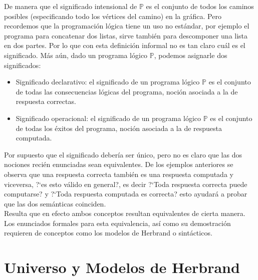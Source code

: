 \documentclass[11pt,letterpaper]{article}
\begin{document}
De manera que el significado intensional de $\mathbb{P}$ es el conjunto de 
todos los caminos posibles (especificando todo los v\'ertices del camino) en la 
gr\'afica. Pero recordemos que la programaci\'on l\'ogica tiene un uso no 
est\'andar, por ejemplo el programa para concatenar dos listas, sirve tambi\'en 
para descomponer una lista en dos partes. Por lo que con esta definici\'on 
informal no es tan claro cu\'al es el significado. M\'as a\'un, dado un 
programa l\'ogico $\mathbb{P}$, podemos asignarle dos significados:
\begin{itemize}
 \item Significado declarativo: 
  el significado de un programa l\'ogico $\mathbb{P}$ es el conjunto de todas 
  las consecuencias l\'ogicas del programa, noci\'on asociada a la de respuesta 
  correctas.
 \item Significado operacional: 
  el significado de un programa l\'ogico $\mathbb{P}$ es el conjunto de todas 
  los \'exitos del programa, noci\'on asociada a la de respuesta computada.
\end{itemize}

Por supuesto que el significado deber\'ia ser \'unico,  pero no es claro que 
las dos nociones reci\'en enunciadas sean equivalentes. De los ejemplos 
anteriores se observa que una respuesta correcta tambi\'en es una respuesta 
computada y viceversa, ?`es esto v\'alido en general?, es decir ?`Toda
respuesta correcta puede computarse? y ?`Toda respuesta computada es
correcta? esto ayudar\'a a probar que las dos sem\'anticas coinciden.  \\
Resulta que en efecto ambos conceptos resultan equivalentes de cierta manera. 
Los enunciados formales para esta equivalencia, as\'i como su demostraci\'on 
requieren de conceptos como los modelos de Herbrand o sint\'acticos.

\section{Universo y Modelos de Herbrand}

\end{document}
